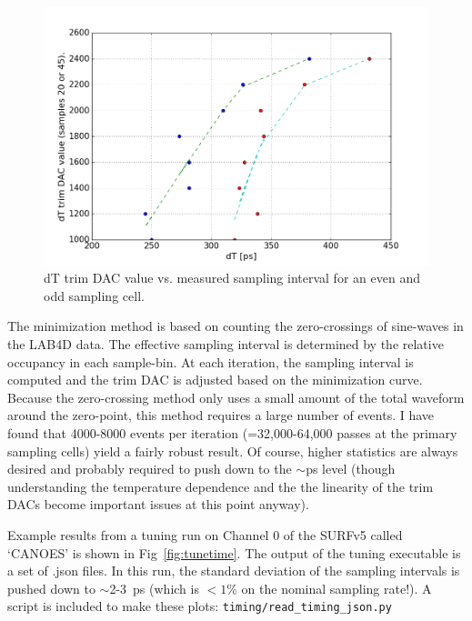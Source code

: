 \documentclass[11pt]{article}
\begin{document}
  \begin{figure}[h!]
  \begin{center}
    \includegraphics[width=12cm]{fig/dt_comparison_odd_even_cell.png}
  \end{center}
  \caption{dT trim DAC value vs. measured sampling interval for an even and odd sampling cell. }
  \label{fig:indivdttrim}
\end{figure}

The minimization method is based on counting the zero-crossings of sine-waves in the LAB4D data. The effective sampling interval is determined by
the relative occupancy in each sample-bin. At each iteration, the sampling interval is computed and the trim DAC is adjusted based on the minimization curve.
Because the zero-crossing method only uses a small amount of the total waveform around the zero-point, this method requires a large number of events. I have found
that 4000-8000 events per iteration (=32,000-64,000 passes at the primary sampling cells) yield a fairly robust result. Of course, higher statistics are always desired
and probably required to push down to the $\sim$ps level (though understanding the temperature dependence and the the linearity of the trim DACs become important issues at this point anyway).

Example results from a tuning run on Channel 0 of the SURFv5 called `CANOES' is shown in Fig~\ref{fig:tunetime}. The output of the tuning executable is a set of
.json files. In this run, the standard deviation of the sampling intervals
is pushed down to $\sim$2-3~ps (which is $< 1$\% on the nominal sampling rate!). A script is included to make these plots: \verb!timing/read_timing_json.py!
\end{document}

